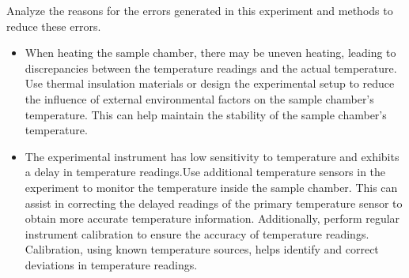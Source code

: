 \documentclass[UTF8]{article}
\begin{document}
	Analyze the reasons for the errors generated in this experiment and methods to reduce these errors.
	\begin{itemize}
	\item When heating the sample chamber, there may be uneven heating, leading to discrepancies between the temperature readings and the actual temperature. Use thermal insulation materials or design the experimental setup to reduce the influence of external environmental factors on the sample chamber's temperature. This can help maintain the stability of the sample chamber's temperature. 
	\item The experimental instrument has low sensitivity to temperature and exhibits a delay in temperature readings.Use additional temperature sensors in the experiment to monitor the temperature inside the sample chamber. This can assist in correcting the delayed readings of the primary temperature sensor to obtain more accurate temperature information. Additionally, perform regular instrument calibration to ensure the accuracy of temperature readings. Calibration, using known temperature sources, helps identify and correct deviations in temperature readings.
	
	\end{itemize}
	
\end{document}
